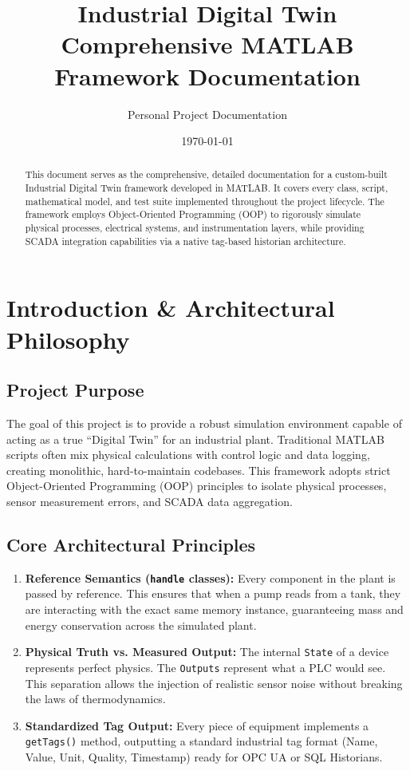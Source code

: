 \documentclass[11pt,a4paper]{report}
\title{\textbf{Industrial Digital Twin}\\ \Large Comprehensive MATLAB Framework Documentation}
\author{Personal Project Documentation}
\date{\today}
\begin{document}
\maketitle

\begin{abstract}
This document serves as the comprehensive, detailed documentation for a custom-built Industrial Digital Twin framework developed in MATLAB. It covers every class, script, mathematical model, and test suite implemented throughout the project lifecycle. The framework employs Object-Oriented Programming (OOP) to rigorously simulate physical processes, electrical systems, and instrumentation layers, while providing SCADA integration capabilities via a native tag-based historian architecture.
\end{abstract}

\tableofcontents
\newpage

\chapter{Introduction \& Architectural Philosophy}

\section{Project Purpose}
The goal of this project is to provide a robust simulation environment capable of acting as a true ``Digital Twin'' for an industrial plant. Traditional MATLAB scripts often mix physical calculations with control logic and data logging, creating monolithic, hard-to-maintain codebases. This framework adopts strict Object-Oriented Programming (OOP) principles to isolate physical processes, sensor measurement errors, and SCADA data aggregation.

\section{Core Architectural Principles}
\begin{enumerate}
    \item \textbf{Reference Semantics (\texttt{handle} classes):} Every component in the plant is passed by reference. This ensures that when a pump reads from a tank, they are interacting with the exact same memory instance, guaranteeing mass and energy conservation across the simulated plant.
    \item \textbf{Physical Truth vs. Measured Output:} The internal \texttt{State} of a device represents perfect physics. The \texttt{Outputs} represent what a PLC would see. This separation allows the injection of realistic sensor noise without breaking the laws of thermodynamics.
    \item \textbf{Standardized Tag Output:} Every piece of equipment implements a \texttt{getTags()} method, outputting a standard industrial tag format (Name, Value, Unit, Quality, Timestamp) ready for OPC UA or SQL Historians.
\end{enumerate}
\end{document}
